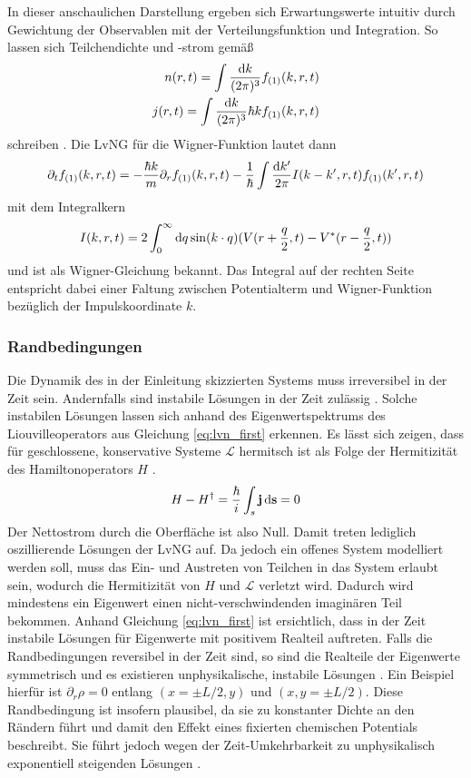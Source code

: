 In dieser anschaulichen Darstellung ergeben sich Erwartungswerte intuitiv durch Gewichtung der Observablen mit der Verteilungsfunktion und Integration. So lassen sich Teilchendichte und -strom gemäß
\begin{align*}
  n(r,t) = \int \frac{\mathop{}\!\mathrm{d} k}{(2\pi)^3}f_{(1)}(k,r,t) \\
  j(r,t) = \int \frac{\mathop{}\!\mathrm{d} k}{(2\pi)^3}\hbar k f_{(1)}(k,r,t)
\end{align*}
schreiben \cite{modern}. Die LvNG für die Wigner-Funktion lautet dann \cite{frensley2, failure}
\begin{equation}
  \partial_t f_{(1)}(k,r,t) = -\frac{\hbar k}{m}\partial_r f_{(1)}(k,r,t) - \frac{1}{\hbar} \int \frac{\mathop{}\!\mathrm{d} k'}{2\pi}I(k-k',r,t)f_{(1)}(k',r,t)
  \label{eq:wigner}
\end{equation}
mit dem Integralkern
\begin{equation*}
  I(k,r,t) = 2\int_0^{\infty} \mathop{}\!\mathrm{d} q \sin(k\cdot q) (V(r+\frac{q}{2},t) - V^*(r-\frac{q}{2},t))
\end{equation*}
und ist als Wigner-Gleichung bekannt. Das Integral auf der rechten Seite entspricht dabei einer Faltung zwischen Potentialterm und Wigner-Funktion bezüglich der Impulskoordinate $k$.

\subsubsection{Randbedingungen}
\label{sec:RB}
Die Dynamik des in der Einleitung skizzierten Systems muss irreversibel in der Zeit sein. Andernfalls sind instabile Lösungen in der Zeit zulässig \cite{frensley2}. Solche instabilen Lösungen lassen sich anhand des Eigenwertspektrums des Liouvilleoperators aus Gleichung \eqref{eq:lvn_first} erkennen. Es lässt sich zeigen, dass für geschlossene, konservative Systeme $\mathcal{L}$ hermitsch ist als Folge der Hermitizität des Hamiltonoperators $H$ \cite{frensley2}.
\begin{align}
  H- H^{\dagger} = \frac{\hbar}{i}\int_s \vb{j}\mathop{}\!\mathrm{d}\vb{s} = 0
\end{align}
Der Nettostrom durch die Oberfläche ist also Null. Damit treten lediglich oszillierende Lösungen der LvNG auf. Da jedoch ein offenes System modelliert werden soll, muss das Ein- und Austreten von Teilchen in das System erlaubt sein, wodurch die Hermitizität von $H$ und $\mathcal{L}$ verletzt wird. Dadurch wird mindestens ein Eigenwert einen nicht-verschwindenden imaginären Teil bekommen. Anhand Gleichung \eqref{eq:lvn_first} ist ersichtlich, dass in der Zeit instabile Lösungen für Eigenwerte mit positivem Realteil auftreten. Falls die Randbedingungen reversibel in der Zeit sind, so sind die Realteile der Eigenwerte symmetrisch und es existieren unphysikalische, instabile Lösungen \cite{frensley2}. Ein Beispiel hierfür ist $\partial_r \rho = 0$ entlang $(x=\pm L/2, y)$ und $(x,y=\pm L/2)$. Diese Randbedingung ist insofern plausibel, da sie zu konstanter Dichte an den Rändern führt und damit den Effekt eines fixierten chemischen Potentials beschreibt. Sie führt jedoch wegen der Zeit-Umkehrbarkeit zu unphysikalisch exponentiell steigenden Lösungen \cite{frensley2}.

